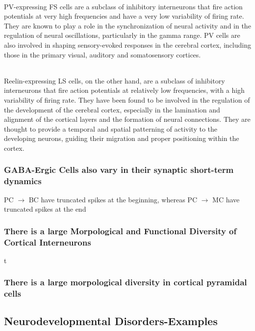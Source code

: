 \begin{itemize}
\begin{itemize}
\\PV-expressing FS cells are a subclass of inhibitory interneurons that fire action potentials at very high frequencies and have a very low variability of firing rate. They are known to play a role in the synchronization of neural activity and in the regulation of neural oscillations, particularly in the gamma range. PV cells are also involved in shaping sensory-evoked responses in the cerebral cortex, including those in the primary visual, auditory and somatosensory cortices.

\\Reelin-expressing LS cells, on the other hand, are a subclass of inhibitory interneurons that fire action potentials at relatively low frequencies, with a high variability of firing rate. They have been found to be involved in the regulation of the development of the cerebral cortex, especially in the lamination and alignment of the cortical layers and the formation of neural connections. They are thought to provide a temporal and spatial patterning of activity to the developing neurons, guiding their migration and proper positioning within the cortex.


\subsubsection{GABA-Ergic Cells also vary  in their synaptic short-term dynamics}
PC $\rightarrow$ BC have truncated spikes at the beginning, whereas PC $\rightarrow$ MC have truncated spikes at the end
\subsubsection{There is a large Morpological and Functional Diversity of Cortical Interneurons}
t
\subsubsection{There is a large morpological diversity in cortical pyramidal cells}

\subsection{Neurodevelopmental Disorders-Examples}

\end{itemize}
\end{itemize}
